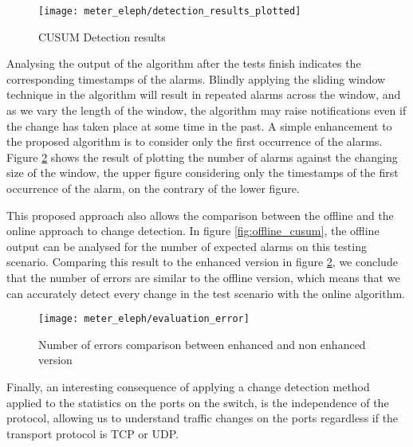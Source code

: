 \begin{figure}
    \centering
    \texttt{[image: meter\_eleph/detection\_results\_plotted]}
    \caption{CUSUM Detection results}
    \label{fig:color_plot}
\end{figure}

\par Analysing the output of the algorithm after the tests finish indicates the corresponding timestamps of the alarms. Blindly applying the sliding window technique
in the algorithm will result in repeated alarms across the window, and as we vary the length of the window, the algorithm may raise notifications even if the change
has taken place at some time in the past. A simple enhancement to the proposed algorithm is to consider only the first occurrence of the alarms. Figure
\ref{fig:errors_comparaison} shows the result of plotting the number of alarms against the changing size of the window, the upper figure considering only the
timestamps of the first occurrence of the alarm, on the contrary of the lower figure.

\par This proposed approach also allows the comparison between the offline and the online approach to change detection. In figure \ref{fig:offline_cusum}, the 
offline output can be analysed for the number of expected alarms on this testing scenario. Comparing this result to the enhanced version in figure 
\ref{fig:errors_comparaison}, we conclude that the number of errors are similar to the offline version, which means that we can accurately detect every change in
the test scenario with the online algorithm.

\begin{figure}
    \centering
    \texttt{[image: meter\_eleph/evaluation\_error]}
    \caption {Number of errors comparison between enhanced and non enhanced version}
    \label{fig:errors_comparaison}
\end{figure} 

\par Finally, an interesting consequence of applying a change detection method applied to the statistics on the ports on the switch, is the independence of the 
protocol, allowing us to understand traffic changes on the ports regardless if the transport protocol is TCP or UDP.
